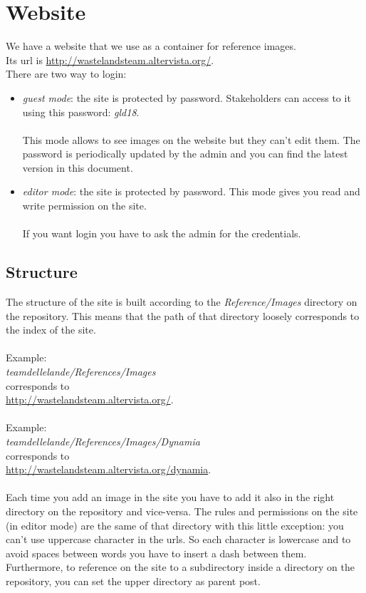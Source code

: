 \section{Website}
We have a website that we use as a container for reference images. \\Its url is \href{http://wastelandsteam.altervista.org/}{http://wastelandsteam.altervista.org/}.\\

There are two way to login: 
\begin{itemize}
\item \textit{guest mode}: the site is protected by password. Stakeholders can access to it using this password: \textit{gld18}.\\\\
  This mode allows to see images on the website but they can't edit them. The password is periodically updated by the admin and you can find the latest version in this document.
\item \textit{editor mode}: the site is protected by password. This mode gives you read and write permission on the site.\\\\
  If you want login you have to ask the admin for the credentials.
\end{itemize}

\subsection{Structure}
The structure of the site is built according to the \textit{Reference/Images} directory on the repository.
This means that the path of that directory loosely corresponds to the index of the site.\\\\
Example: \\
\textit{teamdellelande/References/Images} \\corresponds to\\ \href{http://wastelandsteam.altervista.org/}{http://wastelandsteam.altervista.org/}.\\\\
Example: \\
\textit{teamdellelande/References/Images/Dynamia} \\corresponds to\\ \href{http://wastelandsteam.altervista.org/dynamia}{http://wastelandsteam.altervista.org/dynamia}.\\\\
Each time you add an image in the site you have to add it also in the right directory on the repository and vice-versa.
The rules and permissions on the site (in editor mode) are the same of that directory with this little exception:
you can't use uppercase character in the urls. So each character is lowercase and to avoid spaces between words you have to insert a dash between them. Furthermore, to reference on the site to a subdirectory inside a directory on the repository, you can set the upper directory as parent post.
